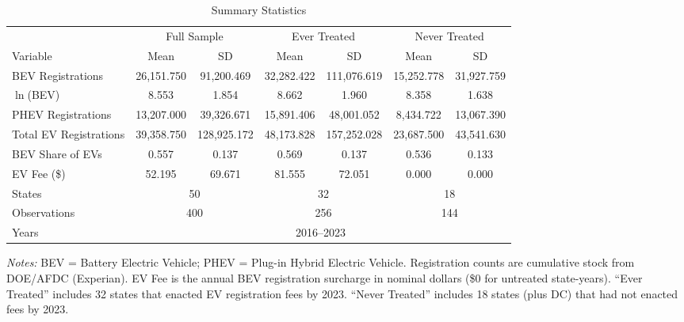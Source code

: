 \begin{table}[t]
\centering
\caption{Summary Statistics}
\label{tab:summary}
\begin{adjustbox}{max width=\textwidth}
\begin{tabular}{lcccccc}
\toprule
 & \multicolumn{2}{c}{Full Sample} & \multicolumn{2}{c}{Ever Treated} & \multicolumn{2}{c}{Never Treated} \\
\cmidrule(lr){2-3} \cmidrule(lr){4-5} \cmidrule(lr){6-7}
Variable & Mean & SD & Mean & SD & Mean & SD \\
\midrule
BEV Registrations & 26,151.750 & 91,200.469 & 32,282.422 & 111,076.619 & 15,252.778 & 31,927.759 \\
$\ln$(BEV) & 8.553 & 1.854 & 8.662 & 1.960 & 8.358 & 1.638 \\
PHEV Registrations & 13,207.000 & 39,326.671 & 15,891.406 & 48,001.052 & 8,434.722 & 13,067.390 \\
Total EV Registrations & 39,358.750 & 128,925.172 & 48,173.828 & 157,252.028 & 23,687.500 & 43,541.630 \\
BEV Share of EVs & 0.557 & 0.137 & 0.569 & 0.137 & 0.536 & 0.133 \\
EV Fee (\$) & 52.195 & 69.671 & 81.555 & 72.051 & 0.000 & 0.000 \\
\midrule
States & \multicolumn{2}{c}{50} & \multicolumn{2}{c}{32} & \multicolumn{2}{c}{18} \\
Observations & \multicolumn{2}{c}{400} & \multicolumn{2}{c}{256} & \multicolumn{2}{c}{144} \\
Years & \multicolumn{6}{c}{2016--2023} \\
\bottomrule
\end{tabular}
\end{adjustbox}
\begin{tablenotes}[flushleft]\small
\item \textit{Notes:} BEV = Battery Electric Vehicle; PHEV = Plug-in Hybrid Electric Vehicle. Registration counts are cumulative stock from DOE/AFDC (Experian). EV Fee is the annual BEV registration surcharge in nominal dollars (\$0 for untreated state-years). ``Ever Treated'' includes 32 states that enacted EV registration fees by 2023. ``Never Treated'' includes 18 states (plus DC) that had not enacted fees by 2023.
\end{tablenotes}
\end{table}

